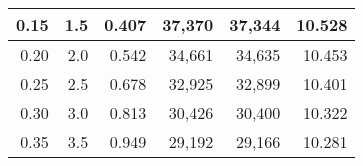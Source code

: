 \begin{longtable}{|r|r|r|r|r|r|}
			0.15                                                                                                   & 1.5                                                                                                   & 0.407                                                                                          & 37,370                                             & 37,344                                                    & 10.528                                            \\ \hline
			0.20                                                                                                   & 2.0                                                                                                   & 0.542                                                                                          & 34,661                                             & 34,635                                                    & 10.453                                            \\ \hline
			0.25                                                                                                   & 2.5                                                                                                   & 0.678                                                                                          & 32,925                                             & 32,899                                                    & 10.401                                            \\ \hline
			0.30                                                                                                   & 3.0                                                                                                   & 0.813                                                                                          & 30,426                                             & 30,400                                                    & 10.322                                            \\ \hline
			0.35                                                                                                   & 3.5                                                                                                   & 0.949                                                                                          & 29,192                                             & 29,166                                                    & 10.281                                            \\ \hline

\end{longtable}
